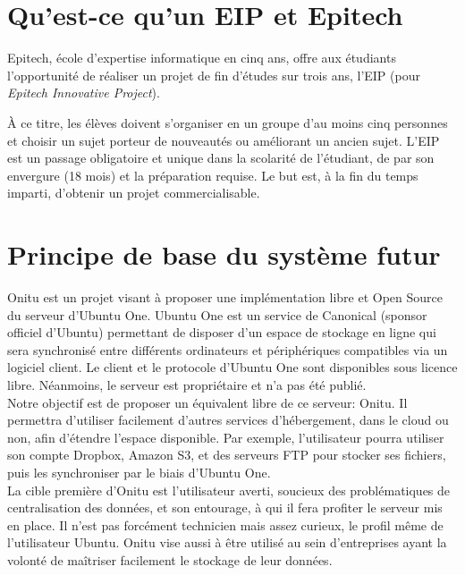 \section{Qu'est-ce qu'un EIP et Epitech}
Epitech, école d'expertise informatique en cinq ans, offre aux étudiants l'opportunité de réaliser un projet de fin d'études sur trois ans, l'EIP (pour \emph{Epitech Innovative Project}).

À ce titre, les élèves doivent s'organiser en un groupe d'au moins cinq personnes et choisir un sujet porteur de nouveautés ou améliorant un ancien sujet. L'EIP est un passage obligatoire et unique dans la scolarité de l'étudiant, de par son envergure (18 mois) et la préparation requise. Le but est, à la fin du temps imparti, d'obtenir un projet commercialisable.


\section{Principe de base du système futur}
Onitu est un projet visant à proposer une implémentation libre et Open Source du serveur d’Ubuntu One. Ubuntu One est un service de Canonical (sponsor officiel d'Ubuntu) permettant de disposer d’un espace de stockage en ligne qui sera synchronisé entre différents ordinateurs et périphériques compatibles via un logiciel client. Le client et le protocole d’Ubuntu One sont disponibles sous licence libre. Néanmoins, le serveur est propriétaire et n’a pas été publié. \\
    

Notre objectif est de proposer un équivalent libre de ce serveur: Onitu. Il permettra d'utiliser facilement d'autres services d'hébergement, dans le cloud ou non, afin d'étendre l'espace disponible. Par exemple, l'utilisateur pourra utiliser son compte Dropbox, Amazon S3, et des serveurs FTP pour stocker ses fichiers, puis les synchroniser par le biais d'Ubuntu One. \\

La cible première d'Onitu est l'utilisateur averti, soucieux des problématiques de centralisation des données, et son entourage, à qui il fera profiter le serveur mis en place. Il n'est pas forcément technicien mais assez curieux, le profil même de l'utilisateur Ubuntu. Onitu vise aussi à être utilisé au sein d'entreprises ayant la volonté de maîtriser facilement le stockage de leur données.
